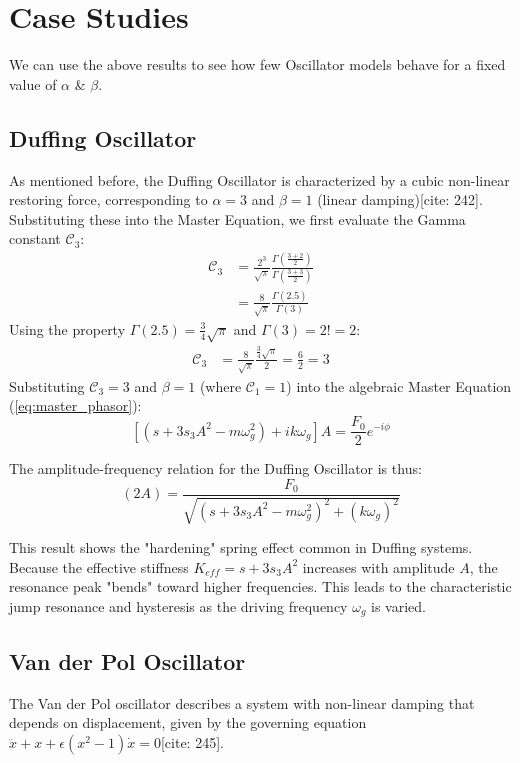 \documentclass[10pt,twoside]{report}
\begin{document}
\section{Case Studies}
We can use the above results to see how few Oscillator models behave for a fixed value of $\alpha$ \& $\beta$.

\subsection{Duffing Oscillator}
As mentioned before, the Duffing Oscillator is characterized by a cubic non-linear restoring force, corresponding to $\alpha=3$ and $\beta=1$ (linear damping)[cite: 242]. Substituting these into the Master Equation, we first evaluate the Gamma constant $\mathcal{C}_{3}$:
\begin{align*}
    \mathcal{C}_{3} &= \frac{2^3}{\sqrt{\pi}} \frac{\Gamma\left(\frac{3+2}{2}\right)}{\Gamma\left(\frac{3+3}{2}\right)} \\
    &= \frac{8}{\sqrt{\pi}} \frac{\Gamma(2.5)}{\Gamma(3)}
\end{align*}
Using the property $\Gamma(2.5) = \frac{3}{4}\sqrt{\pi}$ and $\Gamma(3) = 2! = 2$:
\begin{align*}
    \mathcal{C}_{3} &= \frac{8}{\sqrt{\pi}} \frac{\frac{3}{4}\sqrt{\pi}}{2} = \frac{6}{2} = 3
\end{align*}
Substituting $\mathcal{C}_{3} = 3$ and $\beta=1$ (where $\mathcal{C}_{1}=1$) into the algebraic Master Equation (\ref{eq:master_phasor}):
\begin{equation}
    \left[ (s + 3s_{3}A^2 - m\omega_g^2) + i k \omega_g \right] A = \frac{F_0}{2} e^{-i\phi}
\end{equation}

The amplitude-frequency relation for the Duffing Oscillator is thus:
\begin{equation}
    (2A) = \frac{F_0}{\sqrt{(s + 3s_{3}A^2 - m\omega_g^2)^2 + (k\omega_g)^2}}
\end{equation}



This result shows the "hardening" spring effect common in Duffing systems. Because the effective stiffness $K_{eff} = s + 3s_{3}A^2$ increases with amplitude $A$, the resonance peak "bends" toward higher frequencies. This leads to the characteristic jump resonance and hysteresis as the driving frequency $\omega_g$ is varied.

\subsection{Van der Pol Oscillator}
The Van der Pol oscillator describes a system with non-linear damping that depends on displacement, given by the governing equation $\ddot{x} + x + \epsilon(x^2 - 1)\dot{x} = 0$[cite: 245]. 
\end{document}
